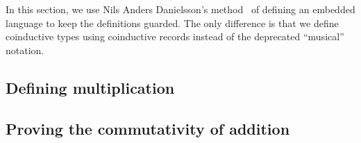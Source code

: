 In this section, we use Nils Anders Danielsson's
method~\cite{danielsson-beating} of defining an embedded language to keep the
definitions guarded. The only difference is that we define coinductive types
using coinductive records instead of the deprecated ``musical'' notation.

\subsection{Defining multiplication}\label{sec:dsl-mul}


\subsection{Proving the commutativity of addition}\label{sec:dsl-comm}


